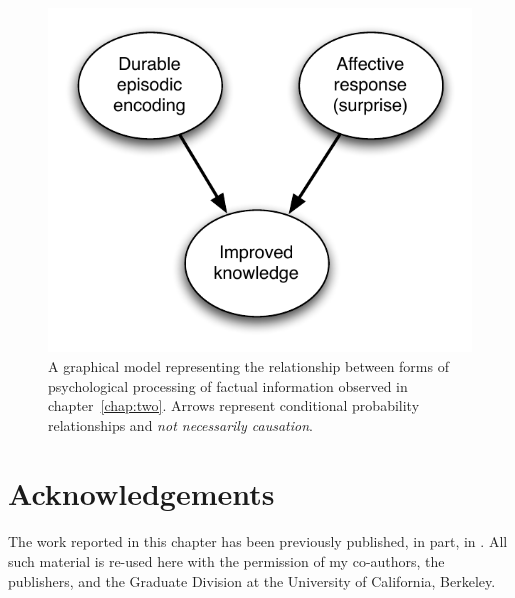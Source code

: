 \begin{figure}
\begin{center}
\includegraphics{causal1.pdf}
\end{center}
\caption{A graphical model representing the relationship between forms of
    psychological processing of factual information observed in
    chapter~\ref{chap:two}. Arrows represent conditional probability
    relationships and \emph{not necessarily causation}.}
\label{fig:causal-two}
\end{figure}

\section*{Acknowledgements}

The work reported in this chapter has been previously published, in part, in
\textcite{clark_known_2010}.  All such material is re-used here with the
permission of my co-authors, the publishers, and the Graduate Division at the
University of California, Berkeley.
